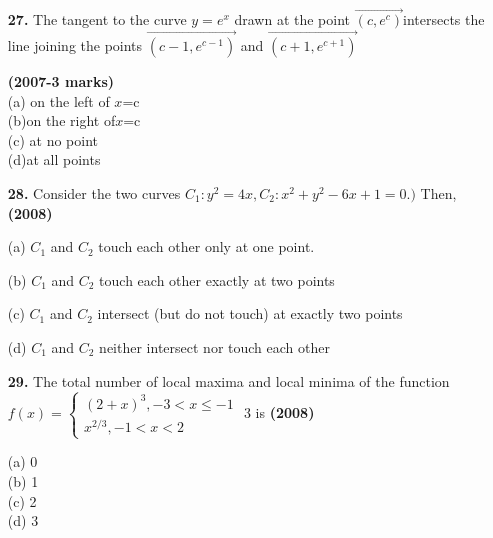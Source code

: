 \documentclass[journal,12pt,twocolumn]{IEEEtran}
\theoremstyle{remark}
\begin{document}
   \begin{enumerate}
      \item [\textbf{27.}] The tangent to the curve $y=e^x$ drawn at the point $\vec{(c,e^c)}$intersects the line joining the points $\vec{(c-1,e^{c-1})}$ and $\vec{(c+1,e^{c+1})}$
    
      \hfill {\textbf{(2007-3 marks)}}\\
      (a) on the left of $x$=c \\
      (b)on the right of$x$=c \\
      (c) at no point \\  
      (d)at all points \\


      
    \end{enumerate}
    \begin{enumerate}
    \item[\textbf{28.}]Consider the two curves $C_{1}:y^2=4x,$$C_{2}:x^2+y^2-6x+1=0.)$ Then,  \hfill{\textbf{(2008)}}
    
    (a) $C_{1}$ and $C_{2}$ touch each other only at one point.
    
    (b) $C_{1}$ and $C_{2}$ touch each other exactly at two points

    (c) $C_{1}$ and $C_{2}$ intersect (but do not touch) at exactly two points

    (d) $C_{1}$ and $C_{2}$ neither intersect nor touch each other 
     
  \end{enumerate}
  \begin{enumerate}
   \item[\textbf{29.} ]The total number of local maxima and local minima of the function \\
   
  $ f(x)=\begin{cases} 
   (2+x)^3, -3<x\le -1\\
   x^{2/3} ,-1<x<2
   \end{cases}$ 3 is
   \hfill{\textbf{(2008)}}

   (a) 0 \\
   (b) 1\\
   (c) 2 \\ 
   (d) 3 \\
       
\end{enumerate}
\end{document}
